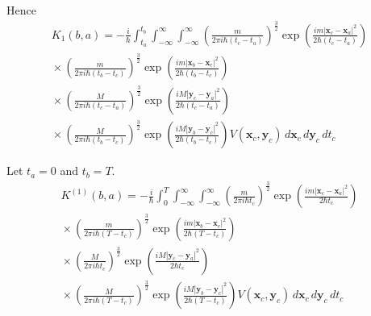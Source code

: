 Hence
\begin{multline*}
K_1(b,a)=-\frac{i}{\hbar}\int_{t_a}^{t_b}\int_{-\infty}^\infty\int_{-\infty}^\infty
\left(\frac{m}{2\pi i\hbar(t_c-t_a)}\right)^\frac{3}{2}
\exp\left(\frac{im|\mathbf x_c-\mathbf x_a|^2}{2\hbar(t_c-t_a)}\right)
\\
{}\times
\left(\frac{m}{2\pi i\hbar(t_b-t_c)}\right)^\frac{3}{2}
\exp\left(\frac{im|\mathbf x_b-\mathbf x_c|^2}{2\hbar(t_b-t_c)}\right)
\\
{}\times
\left(\frac{M}{2\pi i\hbar(t_c-t_a)}\right)^\frac{3}{2}
\exp\left(\frac{iM|\mathbf y_c-\mathbf y_a|^2}{2\hbar(t_c-t_a)}\right)
\\
{}\times
\left(\frac{M}{2\pi i\hbar(t_b-t_c)}\right)^\frac{3}{2}
\exp\left(\frac{iM|\mathbf y_b-\mathbf y_c|^2}{2\hbar(t_b-t_c)}\right)
V(\mathbf x_c,\mathbf y_c)
\,d\mathbf x_c\,d\mathbf y_c\,dt_c
\end{multline*}



Let $t_a=0$ and $t_b=T$.
\begin{multline*}
K^{(1)}(b,a)=-\frac{i}{\hbar}\int_0^T\int_{-\infty}^\infty\int_{-\infty}^\infty
\left(\frac{m}{2\pi i\hbar t_c}\right)^\frac{3}{2}
\exp\left(\frac{im|\mathbf x_c-\mathbf x_a|^2}{2\hbar t_c}\right)
\\
{}\times
\left(\frac{m}{2\pi i\hbar(T-t_c)}\right)^\frac{3}{2}
\exp\left(\frac{im|\mathbf x_b-\mathbf x_c|^2}{2\hbar(T-t_c)}\right)
\\
{}\times
\left(\frac{M}{2\pi i\hbar t_c}\right)^\frac{3}{2}
\exp\left(\frac{iM|\mathbf y_c-\mathbf y_a|^2}{2\hbar t_c}\right)
\\
{}\times
\left(\frac{M}{2\pi i\hbar(T-t_c)}\right)^\frac{3}{2}
\exp\left(\frac{iM|\mathbf y_b-\mathbf y_c|^2}{2\hbar(T-t_c)}\right)
V(\mathbf x_c,\mathbf y_c)
\,d\mathbf x_c\,d\mathbf y_c\,dt_c
\end{multline*}


